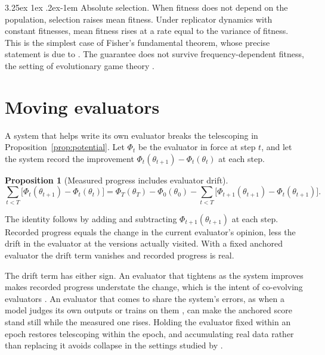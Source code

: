 \documentclass[11pt]{article}
\makeatletter
\renewcommand\paragraph{\@startsection{paragraph}{4}{\z@}%
  {3.25ex \@plus1ex \@minus.2ex}{-1em}%
  {\normalfont\normalsize\itshape}}
\newtheorem{proposition}{Proposition}
\theoremstyle{definition}
\theoremstyle{remark}
\makeatother
\begin{document}
\paragraph{Absolute selection.} When fitness does not depend on the population, selection
raises mean fitness. Under replicator dynamics \citep{taylor1978ess} with constant
fitnesses, mean fitness rises at a rate equal to the variance of fitness. This is the simplest
case of Fisher's fundamental theorem, whose precise statement is due to
\citet{price1972fisher}. The guarantee does not survive frequency-dependent fitness, the setting
of evolutionary game theory \citep{maynardsmith1973conflict}.

\section{Moving evaluators}

A system that helps write its own evaluator breaks the telescoping in
Proposition~\ref{prop:potential}. Let $\Phi_t$ be the evaluator in force at step $t$, and let the
system record the improvement $\Phi_t(\theta_{t+1})-\Phi_t(\theta_t)$ at each step.

\begin{proposition}[Measured progress includes evaluator drift]\label{prop:drift}
\[
\sum_{t<T}\big[\Phi_t(\theta_{t+1})-\Phi_t(\theta_t)\big]
=\Phi_T(\theta_T)-\Phi_0(\theta_0)-\sum_{t<T}\big[\Phi_{t+1}(\theta_{t+1})-\Phi_t(\theta_{t+1})\big].
\]
\end{proposition}

The identity follows by adding and subtracting $\Phi_{t+1}(\theta_{t+1})$ at each step. Recorded
progress equals the change in the current evaluator's opinion, less the drift in the evaluator
at the versions actually visited. With a fixed anchored evaluator the drift term vanishes and
recorded progress is real.

The drift term has either sign. An evaluator that tightens as the system improves makes recorded
progress understate the change, which is the intent of co-evolving evaluators
\citep{iacob2026redqueen}. An evaluator that comes to share the system's errors, as when a model
judges its own outputs \citep{yuan2024selfrewarding,huang2023selfcorrect} or trains on them
\citep{shumailov2024collapse}, can make the anchored score stand still while the measured one
rises. Holding the evaluator fixed within an epoch restores telescoping within the epoch, and
accumulating real data rather than replacing it avoids collapse in the settings studied by
\citet{gerstgrasser2024collapse}.
\end{document}
